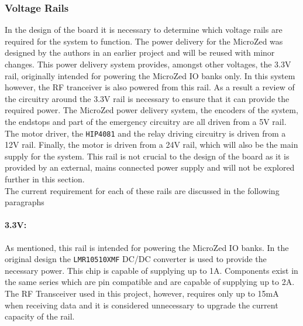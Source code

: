 \subsubsection{Voltage Rails} %
\label{subsub:voltage_rails}
In the design of the board it is necessary to determine which voltage rails are required for the system to function.
The power delivery for the MicroZed was designed by the authors in an earlier project \cite{isaswarm} and will be reused with minor changes.
This power delivery system provides, amongst other voltages, the 3.3V rail, originally intended for powering the MicroZed IO banks only.
In this system however, the RF tranceiver is also powered from this rail.
As a result a review of the circuitry around the 3.3V rail is necessary to ensure that it can provide the required power.
The MicroZed power delivery system, the encoders of the system, the endstops and part of the emergency circuitry are all driven from a 5V rail.
The motor driver, the \texttt{HIP4081} \cite{driver} and the relay driving circuitry is driven from a 12V rail.
Finally, the motor is driven from a 24V rail, which will also be the main supply for the system.
This rail is not crucial to the design of the board as it is provided by an external, mains connected power supply and will not be explored further in this section.\\
The current requirement for each of these rails are discussed in the following paragraphs

\paragraph{3.3V:} %
\label{par:3_3v}
As mentioned, this rail is intended for powering the MicroZed IO banks.
In the original design the \texttt{LMR10510XMF} DC/DC converter is used to provide the necessary power.
This chip is capable of supplying up to 1A.
Components exist in the same series which are pin compatible and are capable of supplying up to 2A.
The RF Transceiver used in this project, however, requires only up to 15mA when receiving data and it is considered unnecessary to upgrade the current capacity of the rail.

